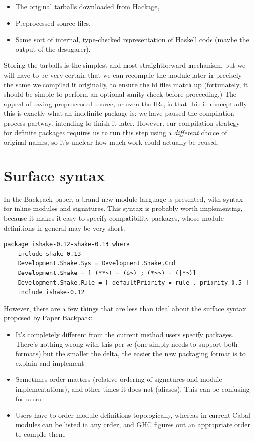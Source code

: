 \documentclass{article}
\begin{document}
\begin{itemize}
    \item The original tarballs downloaded from Hackage,
    \item Preprocessed source files,
    \item Some sort of internal, type-checked representation of Haskell code (maybe the output of the desugarer).
\end{itemize}

Storing the tarballs is the simplest and most straightforward mechanism,
but we will have to be very certain that we can recompile the module
later in precisely the same we compiled it originally, to ensure the hi
files match up (fortunately, it should be simple to perform an optional
sanity check before proceeding.) The appeal of saving preprocessed
source, or even the IRs, is that this is conceptually this is exactly
what an indefinite package is: we have paused the compilation process
partway, intending to finish it later.  However, our compilation strategy
for definite packages requires us to run this step using a \emph{different}
choice of original names, so it's unclear how much work could actually be reused.

\section{Surface syntax}

In the Backpack paper, a brand new module language is presented, with
syntax for inline modules and signatures.  This syntax is probably worth implementing,
because it makes it easy to specify compatibility packages, whose module
definitions in general may be very short:

\begin{verbatim}
package ishake-0.12-shake-0.13 where
    include shake-0.13
    Development.Shake.Sys = Development.Shake.Cmd
    Development.Shake = [ (**>) = (&>) ; (*>>) = (|*>)]
    Development.Shake.Rule = [ defaultPriority = rule . priority 0.5 ]
    include ishake-0.12
\end{verbatim}

However, there are a few things that are less than ideal about the
surface syntax proposed by Paper Backpack:

\begin{itemize}
    \item It's completely different from the current method users
        specify packages. There's nothing wrong with this per se
        (one simply needs to support both formats) but the smaller
        the delta, the easier the new packaging format is to explain
        and implement.

    \item Sometimes order matters (relative ordering of signatures and
        module implementations), and other times it does not (aliases).
        This can be confusing for users.

    \item Users have to order module definitions topologically,
        whereas in current Cabal modules can be listed in any order, and
        GHC figures out an appropriate order to compile them.
\end{itemize}
\end{document}
